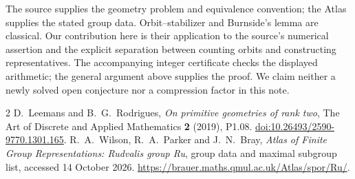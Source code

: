 \documentclass[11pt]{article}
\begin{document}
The source supplies the geometry problem and equivalence convention;
the Atlas supplies the stated group data. Orbit--stabilizer and
Burnside's lemma are classical. Our contribution here is their
application to the source's numerical assertion and the explicit
separation between counting orbits and constructing representatives.
The accompanying integer certificate checks the displayed arithmetic;
the general argument above supplies the proof. We claim neither a
newly solved open conjecture nor a compression factor in this note.

\begin{thebibliography}{2}
 D.~Leemans and B.~G.~Rodrigues,
\emph{On primitive geometries of rank two},
The Art of Discrete and Applied Mathematics \textbf{2} (2019), P1.08.
\href{https://doi.org/10.26493/2590-9770.1301.165}{doi:10.26493/2590-9770.1301.165}.
 R.~A.~Wilson, R.~A.~Parker and J.~N.~Bray,
\emph{Atlas of Finite Group Representations: Rudvalis group Ru},
group data and maximal subgroup list, accessed 14 October 2026.
\url{https://brauer.maths.qmul.ac.uk/Atlas/spor/Ru/}.
\end{thebibliography}
\end{document}
